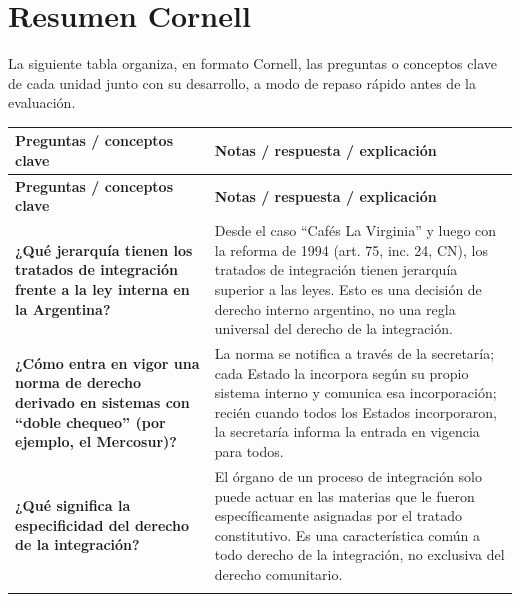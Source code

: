 \documentclass[12pt,oneside]{book}
\begin{document}
\clearpage
\chapter*{Resumen Cornell}

La siguiente tabla organiza, en formato Cornell, las preguntas o conceptos clave de cada unidad junto con su desarrollo, a modo de repaso rápido antes de la evaluación.

\begin{longtable}{
    >{\RaggedRight\arraybackslash}p{}
    >{\RaggedRight\arraybackslash}p{}
}
\toprule
\textbf{Preguntas / conceptos clave} & \textbf{Notas / respuesta / explicación} \\
\midrule
\endfirsthead

\toprule
\textbf{Preguntas / conceptos clave} & \textbf{Notas / respuesta / explicación} \\
\midrule
\endhead

\textbf{¿Qué jerarquía tienen los tratados de integración frente a la ley interna en la Argentina?} &
Desde el caso ``Cafés La Virginia'' y luego con la reforma de 1994 (art. 75, inc. 24, CN), los tratados de integración tienen jerarquía superior a las leyes. Esto es una decisión de derecho interno argentino, no una regla universal del derecho de la integración. \\
\addlinespace
\cmidrule{1-2}

\textbf{¿Cómo entra en vigor una norma de derecho derivado en sistemas con ``doble chequeo'' (por ejemplo, el Mercosur)?} &
La norma se notifica a través de la secretaría; cada Estado la incorpora según su propio sistema interno y comunica esa incorporación; recién cuando todos los Estados incorporaron, la secretaría informa la entrada en vigencia para todos. \\
\addlinespace
\cmidrule{1-2}

\textbf{¿Qué significa la especificidad del derecho de la integración?} &
El órgano de un proceso de integración solo puede actuar en las materias que le fueron específicamente asignadas por el tratado constitutivo. Es una característica común a todo derecho de la integración, no exclusiva del derecho comunitario. \\
\addlinespace
\cmidrule{1-2}


\end{longtable}
\end{document}
